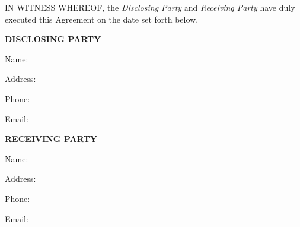 
IN WITNESS WHEREOF, the \textit{Disclosing Party} and \textit{Receiving Party} have duly executed this Agreement on the date set forth below.


\vspace{0.5in}

\hspace{3in}
\textbf{DISCLOSING PARTY}

\vspace{0.2in}
\hspace{3in}
Name: \DisclosingName{}

\vspace{0.2in}

\hspace{3in}
\parbox{3.5in}{
Address: \DisclosingAddress{}
}
\vspace{0.2in}

\hspace{3in}
Phone: \DisclosingPhone{}

\vspace{0.2in}

\hspace{3in}
Email: \DisclosingEmail{}


\vspace{0.5in}

\hspace{3in}
\textbf{RECEIVING PARTY}

\vspace{0.2in}
\hspace{3in}
Name: \ReceivingName{}

\vspace{0.2in}

\hspace{3in}
\parbox{3.5in}{
Address: \ReceivingAddress{}
}
\vspace{0.2in}

\hspace{3in}
Phone: \ReceivingPhone{}

\vspace{0.2in}

\hspace{3in}
Email: \ReceivingEmail{}

